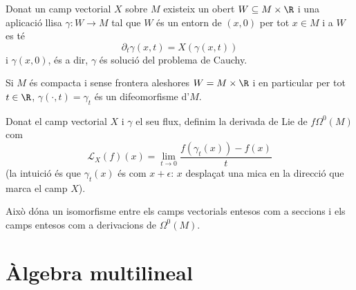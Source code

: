 \documentclass[12pt,twocolumn]{article}
\begin{document}
\parbreak

\begin{theorem}
	Donat un camp vectorial \( X \) sobre \( M \) existeix un obert \( W \subseteq M \times
	\R \) i una aplicació llisa \( \gamma \colon W \to M \) tal que \( W \) és un entorn de
	\( (x,0) \) per tot \( x \in M \) i a \( W \) es té
	\begin{equation*}
		\partial_t \gamma(x,t) = X(\gamma(x,t))
	\end{equation*}
	i \( \gamma(x,0) \), és a dir, \( \gamma \) és solució del problema de Cauchy.

	Si \( M \) és compacta i sense frontera aleshores \( W = M \times \R \) i en particular
	per tot \( t \in \R \), \( \gamma(\cdot, t) = \gamma_t \) és un difeomorfisme d'\( M \). 
\end{theorem}

\begin{definition}
	Donat el camp vectorial \( X \) i \( \gamma \) el seu flux, definim la derivada de Lie
	de \( f \Omega^0(M) \) com
	\begin{equation*}
		\mathcal{L}_X(f)(x) = \lim_{t \to 0} \frac{f(\gamma_t(x)) - f(x)}{t}
	\end{equation*}
	(la intuició és que \( \gamma_t(x) \) és com \( x + \epsilon \): \( x \) desplaçat una
	mica en la direcció que marca el camp	\( X \)).
\end{definition}
Això dóna un isomorfisme entre els camps vectorials entesos com a seccions i els camps
entesos com a derivacions de \( \Omega^0(M) \). 

\section{Àlgebra multilineal}
\end{document}
